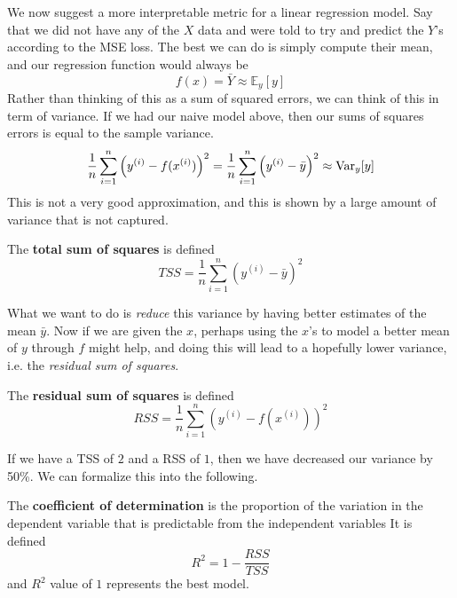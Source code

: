   We now suggest a more interpretable metric for a linear regression model. Say that we did not have any of the $X$ data and were told to try and predict the $Y$'s according to the MSE loss. The best we can do is simply compute their mean, and our regression function would always be 
  \begin{equation}
    f(x) = \bar{Y} \approx \mathbb{E}_y[y]
  \end{equation}
  Rather than thinking of this as a sum of squared errors, we can think of this in term of variance. If we had our naive model above, then our sums of squares errors is equal to the sample variance. 
  \begin{equation}
    \frac{1}{n} \sum_{i=1}^n \left( y^{(i)} - f(x^{(i)}) \right)^2 = \frac{1}{n} \sum_{i=1}^n \left( y^{(i)} - \bar{y} \right)^2  
    \approx \Var_y [y]
  \end{equation}
  This is not a very good approximation, and this is shown by a large amount of variance that is not captured. 

  \begin{definition}
    The \textbf{total sum of squares} is defined 
    \begin{equation}
      TSS = \frac{1}{n} \sum_{i=1}^n \left( y^{(i)} - \bar{y} \right)^2
    \end{equation}
  \end{definition} 

  What we want to do is \textit{reduce} this variance by having better estimates of the mean $\bar{y}$. Now if we are given the $x$, perhaps using the $x$'s to model a better mean of $y$ through $f$ might help, and doing this will lead to a hopefully lower variance, i.e. the \textit{residual sum of squares}. 

  \begin{definition}
    The \textbf{residual sum of squares} is defined 
    \begin{equation}
      RSS = \frac{1}{n} \sum_{i=1}^n \left( y^{(i)} - f(x^{(i)}) \right)^2 
    \end{equation}
  \end{definition} 

  If we have a TSS of $2$ and a RSS of $1$, then we have decreased our variance by 50\%. We can formalize this into the following. 

  \begin{definition}
    The \textbf{coefficient of determination} is the proportion of the variation in the dependent variable that is predictable from the independent variables It is defined 
    \begin{equation}
      R^2 = 1 - \frac{RSS}{TSS}
    \end{equation}
    and $R^2$ value of $1$ represents the best model. 
  \end{definition}


